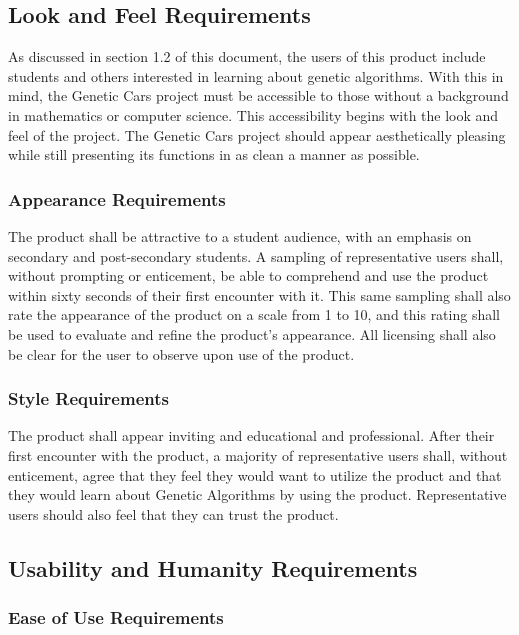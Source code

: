 \documentclass[12pt, titlepage]{article}
\begin{document}
\subsection{Look and Feel Requirements}

As discussed in section 1.2 of this document, the users of this product include 
students and others interested in learning about genetic algorithms. With this 
in mind, the Genetic Cars project must be accessible to those without a 
background in mathematics or computer science. This accessibility begins with 
the look and feel of the project. The Genetic Cars project should appear 
aesthetically pleasing while still presenting its functions in as clean a manner 
as possible.

\subsubsection{Appearance Requirements}

The product shall be attractive to a student audience, with an emphasis on 
secondary and post-secondary students. A sampling of representative users shall, 
without prompting or enticement, be able to comprehend and use the product 
within sixty seconds of their first encounter with it. This same sampling shall 
also rate the appearance of the product on a scale from 1 to 10, and this rating 
shall be used to evaluate and refine the product's appearance. All licensing 
shall also be clear for the user to observe upon use of the product.

\subsubsection{Style Requirements}

The product shall appear inviting and educational and professional. After their 
first encounter with the product, a majority of representative users shall, 
without enticement, agree that they feel they would want to utilize the product 
and that they would learn about Genetic Algorithms by using the product. 
Representative users should also feel that they can trust the product.

\subsection{Usability and Humanity Requirements}

\subsubsection{Ease of Use Requirements}
\end{document}
